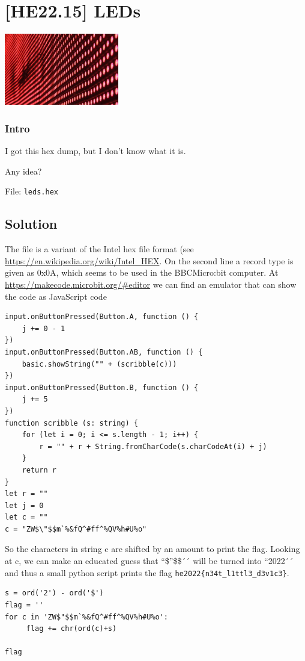 
\hypertarget{he22.15}{%
\chapter{[HE22.15] LEDs}\label{he22.15}}

\begin{marginfigure}
	\includegraphics[width=50mm]{level4/challenge15.jpg}
\end{marginfigure}
\subsection{Intro}
I got this hex dump, but I don't know what it is.

\noindent Any idea?

\noindent File: \verb+leds.hex+

\section{Solution}\label{hv22.15solution}
The file is a variant of the Intel hex file format (see \url{https://en.wikipedia.org/wiki/Intel_HEX}.  On the second line a record type is given as 0x0A, which seems to be used in the BBCMicro:bit computer.  At \url{https://makecode.microbit.org/#editor} we can find an emulator that can show the code as JavaScript code

\begin{verbatim}
input.onButtonPressed(Button.A, function () {
    j += 0 - 1
})
input.onButtonPressed(Button.AB, function () {
    basic.showString("" + (scribble(c)))
})
input.onButtonPressed(Button.B, function () {
    j += 5
})
function scribble (s: string) {
    for (let i = 0; i <= s.length - 1; i++) {
        r = "" + r + String.fromCharCode(s.charCodeAt(i) + j)
    }
    return r
}
let r = ""
let j = 0
let c = ""
c = "ZW$\"$$m`%&fQ^#ff^%QV%h#U%o"
\end{verbatim}

So the characters in string c are shifted by an amount to print the flag.  Looking at c, we can make an educated guess that ``\$''\$\$´´ will be turned into ``2022´´ and thus a small python script prints the flag \verb+he2022{n34t_l1ttl3_d3v1c3}+.
\begin{verbatim}
s = ord('2') - ord('$')
flag = ''
for c in 'ZW$"$$m`%&fQ^#ff^%QV%h#U%o':
     flag += chr(ord(c)+s)

flag
\end{verbatim}






